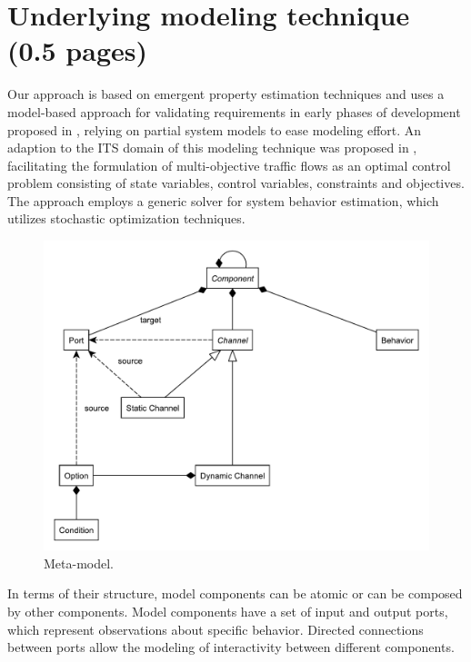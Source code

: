 \section{Underlying modeling technique (0.5 pages)}
\label{section:contribution_0}

Our approach is based on emergent property estimation techniques \cite{hackenberg2012towards} and uses a model-based approach for validating requirements in early phases of development proposed in \cite{hackenberg2014rapid}, relying on partial system models to ease modeling effort. An adaption to the ITS domain of this modeling technique was proposed in \cite{ascher2014early}, facilitating the formulation of multi-objective traffic flows as an optimal control problem consisting of state variables, control variables, constraints and objectives. The approach employs a generic solver for system behavior estimation, which utilizes stochastic optimization techniques.

\begin{figure}[h]
	\centering
	\includegraphics[width=\columnwidth]{../gfx/meta_model.pdf}
	\caption{Meta-model.}
	\label{fig:model}
\end{figure}

In terms of their structure, model components can be atomic or can be composed by other components. Model components have a set of input and output ports, which represent observations about specific behavior. Directed connections between ports allow the modeling of interactivity between different components.


